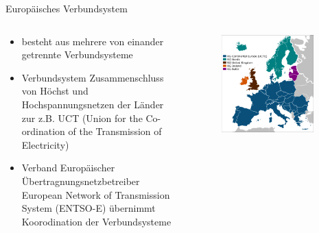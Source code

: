 \documentclass[aspectratio=1610, professionalfonts, 9pt]{beamer}
\begin{document}
{
\begin{frame}{Europäisches Verbundsystem}
\begin{columns}
\begin{column}{0.5\textwidth}
\begin{itemize}
  \item besteht aus mehrere von einander getrennte Verbundsysteme
\item Verbundsystem
Zusammenschluss von Höchst und Hochspannungsnetzen der Länder zur z.B. UCT  (Union for the Co-ordination of the Transmission of Electricity)
  \item Verband Europäischer Übertragnungsnetzbetreiber
   European Network of Transmission System (ENTSO-E) übernimmt Koorodination
der Verbundsysteme
\end{itemize}
\end{column}
\begin{column}{0.5\textwidth}
    \begin{figure}
\includegraphics[width=0.9\textwidth]{images/Euronetz.png}
\end{figure}
\end{column}
\end{columns}
\end{frame}
}
\end{document}
